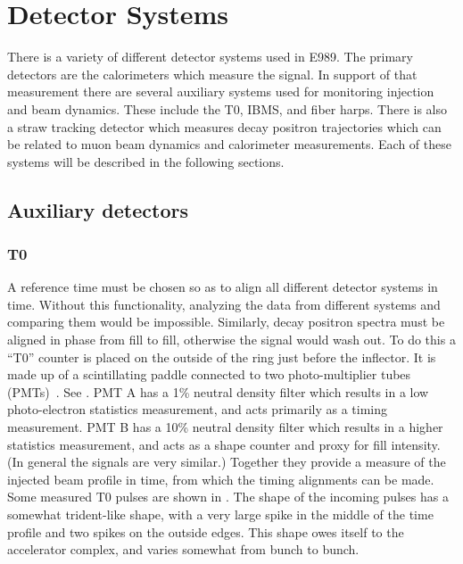 
\thispagestyle{myheadings}

\graphicspath{{Body/Figures/ExperimentalOverview/Auxiliary/}{Body/Figures/ExperimentalOverview/Calorimeter/}{Body/Figures/ExperimentalOverview/Ring/}{Body/Figures/TrackingFigures/TrackerPics/}{Body/Figures/ExperimentalOverview/Ring/}{Body/Figures/TrackingFigures/CoordSys/}{Body/Figures/TrackingFigures/Drift/}{Body/Figures/TrackingFigures/Electronics/}}

\chapter{Detector Systems}
\label{sec:DetectorSystems}

There is a variety of different detector systems used in E989. The primary detectors are the calorimeters which measure the \wa signal. In support of that measurement there are several auxiliary systems used for monitoring injection and beam dynamics. These include the T0, IBMS, and fiber harps. There is also a straw tracking detector which measures decay positron trajectories which can be related to muon beam dynamics and calorimeter measurements. Each of these systems will be described in the following sections.



\section{Auxiliary detectors}

\subsection{T0}
\label{sec:T0}

A reference time must be chosen so as to align all different detector systems in time. Without this functionality, analyzing the data from different systems and comparing them would be impossible. Similarly, decay positron spectra must be aligned in phase from fill to fill, otherwise the \wa signal would wash out. To do this a ``T0'' counter is placed on the outside of the ring just before the inflector. It is made up of a scintillating paddle connected to two photo-multiplier tubes (PMTs)~\cite{t0Hannah,t0Aaron}. See . PMT A has a 1\% neutral density filter which results in a low photo-electron statistics measurement, and acts primarily as a timing measurement. PMT B has a 10\% neutral density filter which results in a higher statistics measurement, and acts as a shape counter and proxy for fill intensity. (In general the signals are very similar.) Together they provide a measure of the injected beam profile in time, from which the timing alignments can be made. Some measured T0 pulses are shown in . The shape of the incoming pulses has a somewhat trident-like shape, with a very large spike in the middle of the time profile and two spikes on the outside edges. This shape owes itself to the accelerator complex, and varies somewhat from bunch to bunch.


